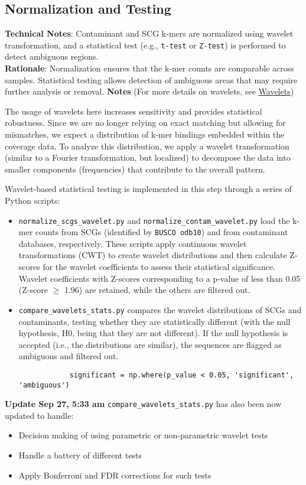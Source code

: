 \documentclass[11pt]{report}
\begin{document}
{\subsection{Normalization and Testing} \textbf{Technical Notes}: Contaminant and SCG k-mers are normalized using wavelet transformation, and a statistical test (e.g., \texttt{t-test} or \texttt{Z-test}) is performed to detect ambiguous regions.\\
\textbf{Rationale}: Normalization ensures that the k-mer counts are comparable across samples. Statistical testing allows detection of ambiguous areas that may require further analysis or removal. 
\textbf{Notes} (For more details on wavelets, see \hyperref[box:wavelets]{Wavelets})


\begin{tcolorbox}[coltitle=white, title=Personal Notes, breakable]
	The usage of wavelets here increases sensitivity and provides statistical robustness. Since we are no longer relying on exact matching but allowing for mismatches, we expect a distribution of k-mer bindings embedded within the coverage data. To analyze this distribution, we apply a wavelet transformation (similar to a Fourier transformation, but localized) to decompose the data into smaller components (frequencies) that contribute to the overall pattern.
	
	Wavelet-based statistical testing is implemented in this step through a series of Python scripts:
	\begin{itemize}
		\item \texttt{normalize\_scgs\_wavelet.py} and \texttt{normalize\_contam\_wavelet.py} load the k-mer counts from SCGs (identified by \texttt{BUSCO odb10}) and from contaminant databases, respectively. These scripts apply continuous wavelet transformations (CWT) to create wavelet distributions and then calculate Z-scores for the wavelet coefficients to assess their statistical significance. Wavelet coefficients with Z-scores corresponding to a p-value of less than 0.05 (Z-score $\geq$ 1.96) are retained, while the others are filtered out.
		\item \texttt{compare\_wavelets\_stats.py} compares the wavelet distributions of SCGs and contaminants, testing whether they are statistically different (with the null hypothesis, H0, being that they are not different). If the null hypothesis is accepted (i.e., the distributions are similar), the sequences are flagged as ambiguous and filtered out.
		\begin{verbatim}
			significant = np.where(p_value < 0.05, 'significant', 'ambiguous')
		\end{verbatim}
	\end{itemize}
	\textbf{Update Sep 27, 5:33 am}
	\texttt{compare\_wavelets\_stats.py} has also been now updated to handle:
		\begin{itemize}
			\item Decision making of using parametric or non-parametric wavelet tests
			\item Handle a battery of different tests
			\item Apply Bonferroni and FDR corrections for such tests 
		\end{itemize}
\end{tcolorbox}

}
\end{document}
